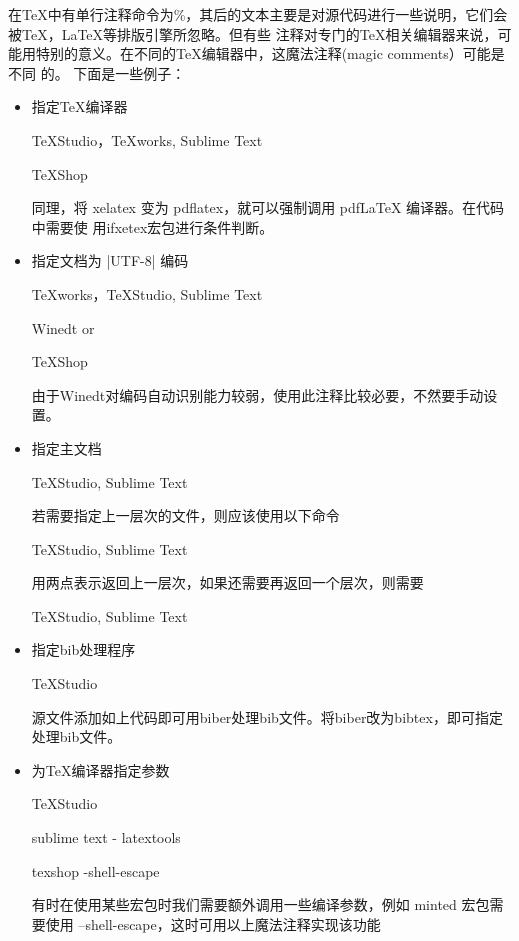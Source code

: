 在TeX中有单行注释命令为\%，其后的文本主要是对源代码进行一些说明，它们会被TeX，LaTeX等排版引擎所忽略。但有些
注释对专门的TeX相关编辑器来说，可能用特别的意义。在不同的TeX编辑器中，这魔法注释(magic comments）可能是不同
的。 下面是一些例子：
\begin{itemize}
  \item 指定\TeX{}编译器
  \begin{texlist}
  TeXStudio，TeXworks, Sublime Text
  
  TeXShop
  \end{texlist}

  同理，将 xelatex 变为 pdflatex，就可以强制调用 pdfLaTeX 编译器。在代码中需要使
  用ifxetex宏包进行条件判断。

  \item 指定文档为 |UTF-8| 编码
  \begin{texlist}
  TeXworks，TeXStudio, Sublime Text
  
  Winedt
  or
  
  TeXShop
  \end{texlist}
  由于Winedt对编码自动识别能力较弱，使用此注释比较必要，不然要手动设置。
  \item 指定主文档
  \begin{texlist}
  TeXStudio, Sublime Text
  \end{texlist}
  若需要指定上一层次的文件，则应该使用以下命令
  \begin{texlist}
  TeXStudio, Sublime Text
  \end{texlist}
  用两点表示返回上一层次，如果还需要再返回一个层次，则需要
  \begin{texlist}
  TeXStudio, Sublime Text
  \end{texlist}
  \item 指定bib处理程序
  \begin{texlist}
  TeXStudio
  \end{texlist}
  源文件添加如上代码即可用biber处理bib文件。将biber改为bibtex，即可指定\BibTeX{}处理bib文件。
  \item 
  为\TeX{}编译器指定参数
  \begin{texlist}
  TeXStudio
  
  sublime text - latextools
  
  texshop
  -shell-escape
  \end{texlist}
  有时在使用某些宏包时我们需要额外调用一些编译参数，例如 minted 宏包需要使用 --shell-escape，这时可用以上魔法注释实现该功能
\end{itemize}

